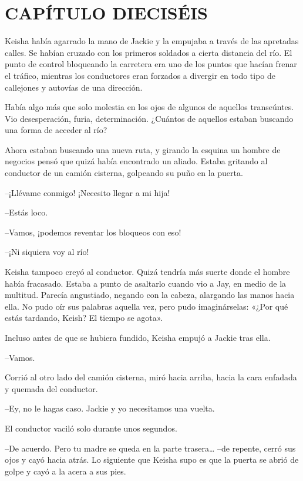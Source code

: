 \chapter*{CAPÍTULO DIECISÉIS}

{Keisha había agarrado la mano de Jackie y la empujaba a través de las
 apretadas calles. Se habían cruzado con los primeros soldados a cierta
 distancia del río. El punto de control bloqueando la carretera era uno
 de los puntos que hacían frenar el tráfico, mientras los conductores
 eran forzados a divergir en todo tipo de callejones y autovías de una
dirección.}

{Había algo más que solo molestia en los ojos de algunos de aquellos
 transeúntes. Vio desesperación, furia, determinación. ¿Cuántos de
aquellos estaban buscando una forma de acceder al río?}

{Ahora estaban buscando una nueva ruta, y girando la esquina un hombre
 de negocios pensó que quizá había encontrado un aliado. Estaba gritando
al conductor de un camión cisterna, golpeando su puño en la puerta.}

{--¡Llévame conmigo! ¡Necesito llegar a mi hija!}

{--Estás loco.}

{--Vamos, ¡podemos reventar los bloqueos con eso!}

{--¡Ni siquiera voy al río!}

{Keisha tampoco creyó al conductor. Quizá tendría más suerte donde el
 hombre había fracasado. Estaba a punto de asaltarlo cuando vio a Jay, en
 medio de la multitud. Parecía angustiado, negando con la cabeza,
 alargando las manos hacia ella. No pudo oír sus palabras aquella vez,
 pero pudo imaginárselas: «¿Por qué estás tardando, Keish? El tiempo se
agota».}

{Incluso antes de que se hubiera fundido, Keisha empujó a Jackie tras
ella.}

{--Vamos.}

{Corrió al otro lado del camión cisterna, miró hacia arriba, hacia la
cara enfadada y quemada del conductor.}

{--Ey, no le hagas caso. Jackie y yo necesitamos una vuelta.}

{El conductor vaciló solo durante unos segundos.}

{--De acuerdo. Pero tu madre se queda en la parte trasera\ldots{} --de
 repente, cerró sus ojos y cayó hacia atrás. Lo siguiente que Keisha supo
es que la puerta se abrió de golpe y cayó a la acera a sus pies.}

